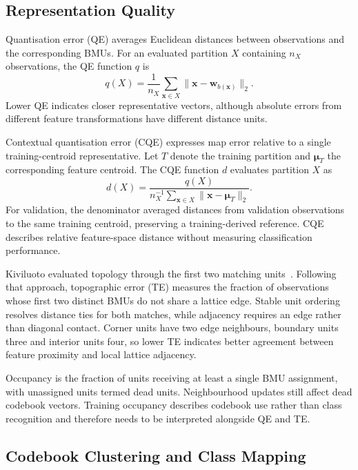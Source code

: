\subsection{Representation Quality}

Quantisation error (QE) averages Euclidean distances between observations and the corresponding BMUs. For an evaluated partition $X$ containing $n_X$ observations, the QE function $q$ is
\begin{equation}
 q(X)=\frac{1}{n_X}\sum_{\mathbf{x}\in X}
          \|\mathbf{x}-\mathbf{w}_{b(\mathbf{x})}\|_2.
 \label{eq:qe}
\end{equation}
Lower QE indicates closer representative vectors, although absolute errors from different feature transformations have different distance units.

Contextual quantisation error (CQE) expresses map error relative to a single training-centroid representative. Let $T$ denote the training partition and $\boldsymbol{\mu}_T$ the corresponding feature centroid. The CQE function $d$ evaluates partition $X$ as
\begin{equation}
 d(X)=\frac{q(X)}
 {n_X^{-1}\sum_{\mathbf{x}\in X}\|\mathbf{x}-\boldsymbol{\mu}_T\|_2}.
 \label{eq:cqe}
\end{equation}
For validation, the denominator averaged distances from validation observations to the same training centroid, preserving a training-derived reference. CQE describes relative feature-space distance without measuring classification performance.

Kiviluoto evaluated topology through the first two matching units~\cite{kiviluoto1996}. Following that approach, topographic error (TE) measures the fraction of observations whose first two distinct BMUs do not share a lattice edge. Stable unit ordering resolves distance ties for both matches, while adjacency requires an edge rather than diagonal contact. Corner units have two edge neighbours, boundary units three and interior units four, so lower TE indicates better agreement between feature proximity and local lattice adjacency.

Occupancy is the fraction of units receiving at least a single BMU assignment, with unassigned units termed dead units. Neighbourhood updates still affect dead codebook vectors. Training occupancy describes codebook use rather than class recognition and therefore needs to be interpreted alongside QE and TE.

\subsection{Codebook Clustering and Class Mapping}

